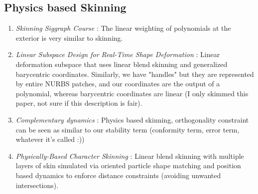 \documentclass[sigconf]{acmart}
\begin{document}
\subsection{Physics based Skinning}
\begin{enumerate}
    \item \textit{Skinning Siggraph Course} \cite{10.1145/2614028.2615427}: The linear weighting of polynomials at the exterior is very similar to skinning.
    \item \textit{Linear Subspace Design for Real-Time Shape Deformation} \cite{10.1145/2766952}: Linear deformation subspace that uses linear blend skinning and generalized barycentric coordinates. Similarly, we have "handles" but they are represented by entire NURBS patches, and our coordinates are the output of a polynomial, whereas barycentric coordinates are linear (I only skimmed this paper, not sure if this description is fair).
    \item \textit{Complementary dynamics} \cite{Zhang_2020}: Physics based skinning, orthogonality constraint can be seen as similar to our stability term (conformity term, error term, whatever it's called :))
    \item \textit{Physically-Based Character Skinning} \cite{10.2312/PE.vriphys.vriphys13.025-034}: Linear blend skinning with multiple layers of skin simulated via oriented particle shape matching and position based dynamics to enforce distance constraints (avoiding unwanted intersections).
\end{enumerate}
\end{document}
